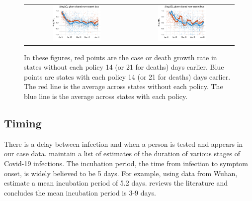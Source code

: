 \documentclass[11pt,reqno,letter]{amsart}
\theoremstyle{definition}
\begin{document}
\begin{figure}
\begin{minipage}{\linewidth}
\begin{tabular}{cc}
      \\
      \includegraphics[width=0.483\textwidth]{tables_and_figures/pnonessential-cases-14}
      &
        \includegraphics[width=0.483\textwidth]{tables_and_figures/pnonessential-deaths-21}
    \end{tabular}
  \end{minipage}
     \begin{flushleft}
      \footnotesize  In these figures, red points are the case or death
      growth rate in states without each policy 14 (or 21 for deaths)
      days earlier.  Blue points are states with each policy 14 (or 21
      for deaths) days earlier.  The red line is the average across
      states without each policy. The blue line is the average across
      states with each policy.    \end{flushleft}
\end{figure}

\subsection{Timing\label{sec:timing}}

There is a delay between infection and when a person is tested and
appears in our case data. \cite{midas2020} maintain a list of
estimates of the duration of various stages of Covid-19
infections. The incubation period, the time from infection to symptom
onset, is widely believed to be 5 days. For example, using data from
Wuhan, \cite{li2020} estimate a mean incubation period of 5.2 days.
\cite{siorda2020} reviews the literature and concludes the mean
incubation period is 3-9 days.
\end{document}
